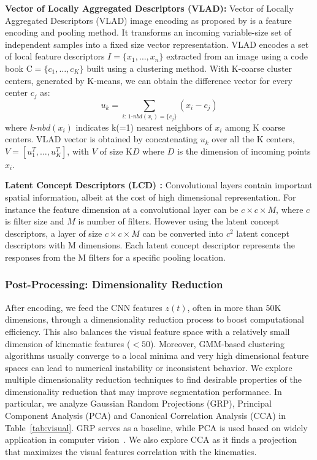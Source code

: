 \documentclass[0-main.tex]{subfiles}
\begin{document}
\vspace{0.25em}
\noindent\textbf{Vector of Locally Aggregated Descriptors (VLAD)\cite{arandjelovic2013all}: }
Vector of Locally Aggregated Descriptors (VLAD) image encoding as proposed by is a feature encoding and pooling method. 
It transforms an incoming variable-size set of independent samples into a fixed size vector representation.
VLAD encodes a set of local feature descriptors $I=\{x_1,\ldots,x_n\}$ extracted from an image using a code book $\mathrm{C} = \{c_1, \ldots, c_K \}$ built using a clustering method. With K-coarse cluster centers, generated by K-means, we can obtain the difference vector for every center $c_j$ as:\vspace{-5pt}
\[ u_k = \sum_{i:\,1\text{-}nbd(x_i)=\{c_j\}} (x_i- c_j)
\]
where $k\text{-}nbd(x_i)$ indicates k(=1) nearest neighbors of $x_i$ among K coarse centers.
VLAD vector is obtained by concatenating $u_k$ over all the K centers, $V = [u_1^T, \ldots, u_K^T]$, with $V$ of size K$D$ where $D$ is the dimension of incoming points $x_i$. 

\vspace{0.25em}
\noindent\textbf{Latent Concept Descriptors (LCD) \cite{xu2014discriminative}: }
Convolutional layers contain important spatial information, albeit at the cost of high dimensional representation. For instance the feature dimension at a convolutional layer can be $c\times c \times M$, where $c$ is filter size and $M$ is number of filters. However using the latent concept descriptors, a layer of size $c\times c \times M$ can be converted into $c^2$ latent concept descriptors with M dimensions. Each latent concept descriptor represents the responses from the M filters for a specific pooling location. 
\fi

\subsubsection{Post-Processing: Dimensionality Reduction}
After encoding, we feed the CNN features $z(t)$, often in more than $50$K dimensions, through a dimensionality reduction process to boost computational efficiency. This also balances the visual feature space with a relatively small dimension of kinematic features ($<50$).
Moreover, GMM-based clustering algorithms usually converge to a local minima and very high dimensional feature spaces can lead to numerical instability or inconsistent behavior.
We explore multiple dimensionality reduction techniques to find desirable properties of the dimensionality reduction that may improve segmentation performance.
In particular, we analyze Gaussian Random Projections (GRP), Principal Component Analysis (PCA) and Canonical Correlation Analysis (CCA) in Table~\ref{tab:visual}. GRP serves as a baseline, while PCA is used based on widely application in computer vision~\cite{xu2014discriminative}. We also explore CCA as it finds a projection that maximizes the visual features correlation with the kinematics. 
\end{document}
